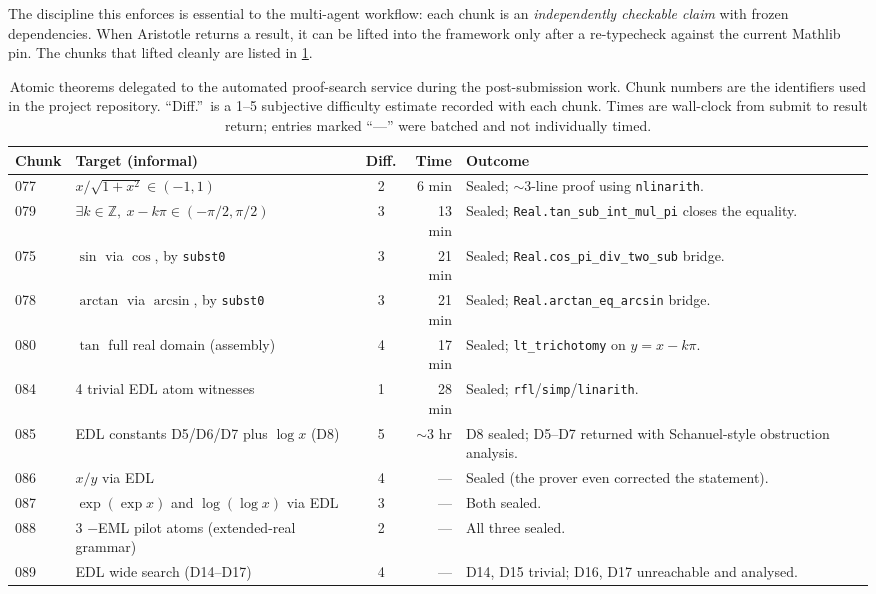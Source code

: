 \documentclass[11pt,a4paper]{article}
\theoremstyle{plain}
\theoremstyle{definition}
\begin{document}
The discipline this enforces is essential to the multi-agent
workflow: each chunk is an
\emph{independently checkable claim} with frozen dependencies. When
Aristotle returns a result, it can be lifted into the framework only
after a re-typecheck against the current Mathlib pin. The chunks
that lifted cleanly are listed in \cref{tab:aristotle-chunks}.

\begin{table}[ht]
\centering
\footnotesize
\begin{tabularx}{\linewidth}{@{}l X c r X@{}}
\toprule
\textbf{Chunk} & \textbf{Target (informal)} & \textbf{Diff.} & \textbf{Time} & \textbf{Outcome} \\
\midrule
077 & $x/\sqrt{1+x^2} \in (-1, 1)$ & 2 & 6 min & Sealed; $\sim$3-line proof using \texttt{nlinarith}. \\
079 & $\exists k \in \mathbb{Z},\ x - k\pi \in (-\pi/2, \pi/2)$ & 3 & 13 min & Sealed; \texttt{Real.tan\_sub\_int\_mul\_pi} closes the equality. \\
075 & $\sin$ via $\cos$, by \texttt{subst0} & 3 & 21 min & Sealed; \texttt{Real.cos\_pi\_div\_two\_sub} bridge. \\
078 & $\arctan$ via $\arcsin$, by \texttt{subst0} & 3 & 21 min & Sealed; \texttt{Real.arctan\_eq\_arcsin} bridge. \\
080 & $\tan$ full real domain (assembly) & 4 & 17 min & Sealed; \texttt{lt\_trichotomy} on $y = x - k\pi$. \\
084 & 4 trivial EDL atom witnesses & 1 & 28 min & Sealed; \texttt{rfl}/\texttt{simp}/\texttt{linarith}. \\
085 & EDL constants D5/D6/D7 plus $\log x$ (D8) & 5 & $\sim$3 hr & D8 sealed; D5--D7 returned with Schanuel-style obstruction analysis. \\
086 & $x/y$ via EDL & 4 & --- & Sealed (the prover even corrected the statement). \\
087 & $\exp(\exp x)$ and $\log(\log x)$ via EDL & 3 & --- & Both sealed. \\
088 & 3 $-\!$EML pilot atoms (extended-real grammar) & 2 & --- & All three sealed. \\
089 & EDL wide search (D14--D17) & 4 & --- & D14, D15 trivial; D16, D17 unreachable and analysed. \\
\bottomrule
\end{tabularx}
\caption{Atomic theorems delegated to the automated proof-search
service during the post-submission work. Chunk numbers are the
identifiers used in the project repository. ``Diff.''\ is a 1--5
subjective difficulty estimate recorded with each chunk. Times are
wall-clock from submit to result return; entries marked ``---'' were
batched and not individually timed.}
\label{tab:aristotle-chunks}
\end{table}
\end{document}
